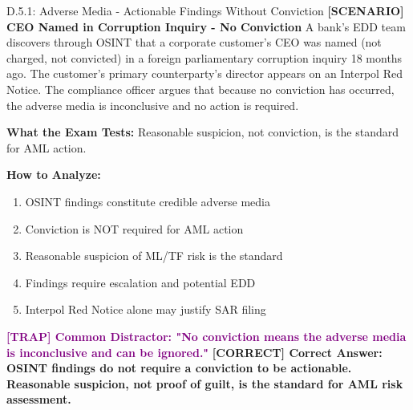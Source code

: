 \documentclass[11pt,a4paper]{beamer}
\newcommand{\trap}[1]{\textcolor{purple}{\textbf{[TRAP] #1}}}
\newcommand{\correct}[1]{\textcolor{green!50!black}{\textbf{[CORRECT] #1}}}
\newcommand{\scenario}[1]{\textcolor{blue!70!black}{\textbf{[SCENARIO] #1}}}
\begin{document}
\begin{frame}{D.5.1: Adverse Media - Actionable Findings Without Conviction}
	\scenario{CEO Named in Corruption Inquiry - No Conviction}
	A bank's EDD team discovers through OSINT that a corporate customer's CEO was named (not charged, not convicted) in a foreign parliamentary corruption inquiry 18 months ago. The customer's primary counterparty's director appears on an Interpol Red Notice. The compliance officer argues that because no conviction has occurred, the adverse media is inconclusive and no action is required.
	
	\vspace{0.1cm}
	\textbf{What the Exam Tests:} Reasonable suspicion, not conviction, is the standard for AML action.
	
	\vspace{0.1cm}
	\textbf{How to Analyze:}
	\begin{enumerate}
		\item OSINT findings constitute credible adverse media
		\item Conviction is NOT required for AML action
		\item Reasonable suspicion of ML/TF risk is the standard
		\item Findings require escalation and potential EDD
		\item Interpol Red Notice alone may justify SAR filing
	\end{enumerate}
	
	\trap{Common Distractor: "No conviction means the adverse media is inconclusive and can be ignored."}
	\correct{Correct Answer: OSINT findings do not require a conviction to be actionable. Reasonable suspicion, not proof of guilt, is the standard for AML risk assessment.}
\end{frame}
\end{document}
